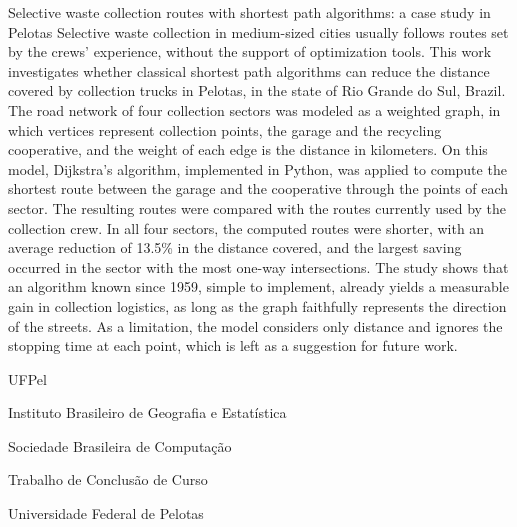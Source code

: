 \documentclass[tcc,capa]{texufpel}
\begin{document}
\begin{englishabstract}{Selective waste collection routes with shortest path algorithms: a case study in Pelotas}
Selective waste collection in medium-sized cities usually follows routes set
by the crews' experience, without the support of optimization tools. This
work investigates whether classical shortest path algorithms can reduce the
distance covered by collection trucks in Pelotas, in the state of Rio Grande
do Sul, Brazil. The road network of four collection sectors was modeled as a
weighted graph, in which vertices represent collection points, the garage and
the recycling cooperative, and the weight of each edge is the distance in
kilometers. On this model, Dijkstra's algorithm, implemented in Python, was
applied to compute the shortest route between the garage and the cooperative
through the points of each sector. The resulting routes were compared with
the routes currently used by the collection crew. In all four sectors, the
computed routes were shorter, with an average reduction of 13.5\% in the
distance covered, and the largest saving occurred in the sector with the most
one-way intersections. The study shows that an algorithm known since 1959,
simple to implement, already yields a measurable gain in collection
logistics, as long as the graph faithfully represents the direction of the
streets. As a limitation, the model considers only distance and ignores the
stopping time at each point, which is left as a suggestion for future work.
\end{englishabstract}

\listoffigures
\listofquadros   %
\listoftables

\begin{listofabbrv}{UFPel}
  \item[IBGE]  Instituto Brasileiro de Geografia e Estatística
  \item[SBC]   Sociedade Brasileira de Computação
  \item[TCC]   Trabalho de Conclusão de Curso
  \item[UFPel] Universidade Federal de Pelotas
\end{listofabbrv}

\tableofcontents
\end{document}
